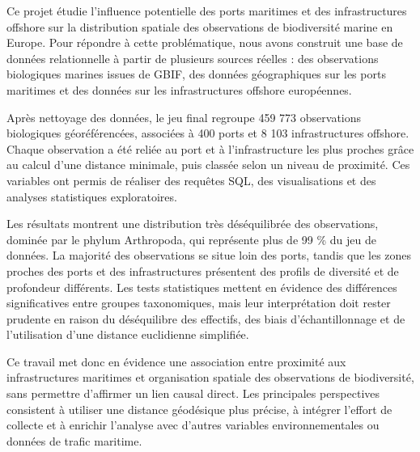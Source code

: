 \documentclass[mstat,12pt]{unswthesis}
\begin{document}
\begin{center}
\begin{minipage}{0.86\textwidth}
\justifying
Ce projet étudie l'influence potentielle des ports maritimes et des
infrastructures offshore sur la distribution spatiale des observations
de biodiversité marine en Europe. Pour répondre à cette problématique,
nous avons construit une base de données relationnelle à partir de
plusieurs sources réelles : des observations biologiques marines issues
de GBIF, des données géographiques sur les ports maritimes et des
données sur les infrastructures offshore européennes.

Après nettoyage des données, le jeu final regroupe 459 773 observations
biologiques géoréférencées, associées à 400 ports et 8 103
infrastructures offshore. Chaque observation a été reliée au port et à
l'infrastructure les plus proches grâce au calcul d'une distance
minimale, puis classée selon un niveau de proximité. Ces variables ont
permis de réaliser des requêtes SQL, des visualisations et des analyses
statistiques exploratoires.

Les résultats montrent une distribution très déséquilibrée des
observations, dominée par le phylum Arthropoda, qui représente plus de
99 \% du jeu de données. La majorité des observations se situe loin des
ports, tandis que les zones proches des ports et des infrastructures
présentent des profils de diversité et de profondeur différents. Les
tests statistiques mettent en évidence des différences significatives
entre groupes taxonomiques, mais leur interprétation doit rester
prudente en raison du déséquilibre des effectifs, des biais
d'échantillonnage et de l'utilisation d'une distance euclidienne
simplifiée.

Ce travail met donc en évidence une association entre proximité aux
infrastructures maritimes et organisation spatiale des observations de
biodiversité, sans permettre d'affirmer un lien causal direct. Les
principales perspectives consistent à utiliser une distance géodésique
plus précise, à intégrer l'effort de collecte et à enrichir l'analyse
avec d'autres variables environnementales ou données de trafic maritime.
\end{minipage}
\end{center}



\afterpreface





%
%
\end{document}
